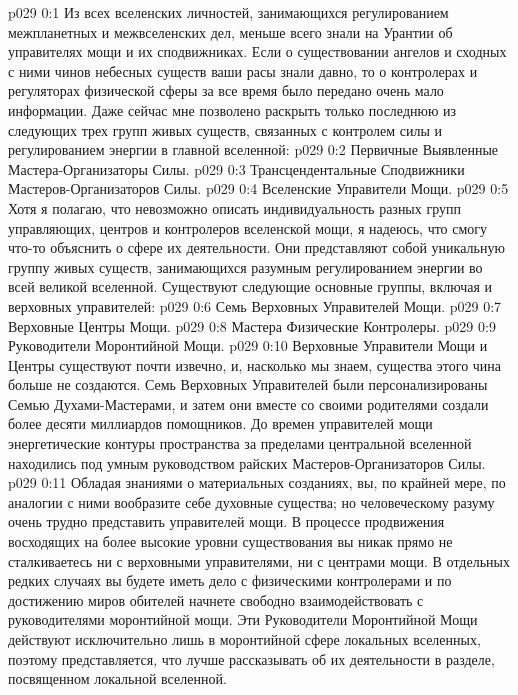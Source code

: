 \author{Вселенский Цензор}
\vs p029 0:1 Из всех вселенских личностей, занимающихся регулированием межпланетных и межвселенских дел, меньше всего знали на Урантии об управителях мощи и их сподвижниках. Если о существовании ангелов и сходных с ними чинов небесных существ ваши расы знали давно, то о контролерах и регуляторах физической сферы за все время было передано очень мало информации. Даже сейчас мне позволено раскрыть только последнюю из следующих трех групп живых существ, связанных с контролем силы и регулированием энергии в главной вселенной:
\vs p029 0:2 \pc {}\bibnobreakspace Первичные Выявленные Мастера\hyp{}Организаторы Силы.
\vs p029 0:3 \bibnobreakspace Трансцендентальные Сподвижники Мастеров\hyp{}Организаторов Силы.
\vs p029 0:4 \bibnobreakspace Вселенские Управители Мощи.
\vs p029 0:5 \pc Хотя я полагаю, что невозможно описать индивидуальность разных групп управляющих, центров и контролеров вселенской мощи, я надеюсь, что смогу что\hyp{}то объяснить о сфере их деятельности. Они представляют собой уникальную группу живых существ, занимающихся разумным регулированием энергии во всей великой вселенной. Существуют следующие основные группы, включая и верховных управителей:
\vs p029 0:6 \bibnobreakspace Семь Верховных Управителей Мощи.
\vs p029 0:7 \bibnobreakspace Верховные Центры Мощи.
\vs p029 0:8 \bibnobreakspace Мастера Физические Контролеры.
\vs p029 0:9 \bibnobreakspace Руководители Моронтийной Мощи.
\vs p029 0:10 \pc Верховные Управители Мощи и Центры существуют почти извечно, и, насколько мы знаем, существа этого чина больше не создаются. Семь Верховных Управителей были персонализированы Семью Духами\hyp{}Мастерами, и затем они вместе со своими родителями создали более десяти миллиардов помощников. До времен управителей мощи энергетические контуры пространства за пределами центральной вселенной находились под умным руководством райских Мастеров\hyp{}Организаторов Силы.
\vs p029 0:11 Обладая знаниями о материальных созданиях, вы, по крайней мере, по аналогии с ними вообразите себе духовные существа; но человеческому разуму очень трудно представить управителей мощи. В процессе продвижения восходящих на более высокие уровни существования вы никак прямо не сталкиваетесь ни с верховными управителями, ни с центрами мощи. В отдельных редких случаях вы будете иметь дело с физическими контролерами и по достижению миров обителей начнете свободно взаимодействовать с руководителями моронтийной мощи. Эти Руководители Моронтийной Мощи действуют исключительно лишь в моронтийной сфере локальных вселенных, поэтому представляется, что лучше рассказывать об их деятельности в разделе, посвященном локальной вселенной.
